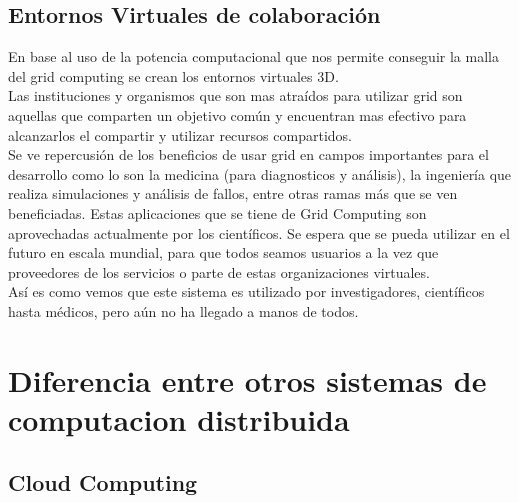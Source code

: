 \documentclass[12pt]{article}
\begin{document}
{{\subsection{Entornos Virtuales de colaboraci\'on}
En base al uso de la potencia computacional que nos permite conseguir la malla del grid computing se crean los entornos virtuales 3D.\\
\vspace{0.2in}
Las instituciones y organismos que son mas atra\'idos para utilizar grid son aquellas que comparten un objetivo com\'un y encuentran mas efectivo para alcanzarlos el compartir y utilizar recursos compartidos.\\
Se ve repercusi\'on de los beneficios de usar grid en campos importantes para el desarrollo como lo son la medicina (para diagnosticos y an\'alisis), la ingenier\'ia que realiza simulaciones y an\'alisis de fallos, entre otras ramas m\'as que se ven beneficiadas.
Estas aplicaciones que se tiene de Grid Computing son aprovechadas actualmente por los cient\'ificos. Se espera que se pueda utilizar en el futuro en escala mundial, para que todos seamos usuarios a la vez que proveedores de los servicios o parte de estas organizaciones virtuales.\\
As\'i es como vemos que este sistema es utilizado por investigadores, cient\'ificos hasta m\'edicos, pero a\'un no ha llegado a manos de todos.\\
}

\newpage
{\raggedright
\section{Diferencia entre otros sistemas de computacion distribuida}
\subsection{Cloud Computing}
}}
\end{document}
